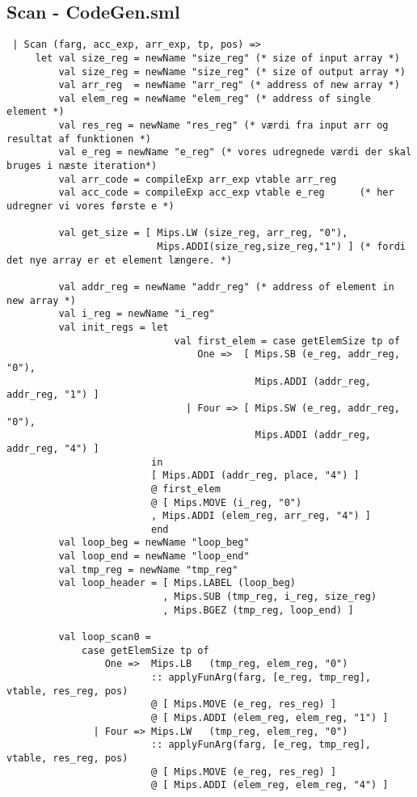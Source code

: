 \documentclass{article}
\begin{document}
\subsection{Scan - CodeGen.sml}\label{app:scan}
\begin{verbatim}
 | Scan (farg, acc_exp, arr_exp, tp, pos) =>
     let val size_reg = newName "size_reg" (* size of input array *)
         val size_reg = newName "size_reg" (* size of output array *)
         val arr_reg  = newName "arr_reg" (* address of new array *)
         val elem_reg = newName "elem_reg" (* address of single element *)
         val res_reg = newName "res_reg" (* værdi fra input arr og resultat af funktionen *)
         val e_reg = newName "e_reg" (* vores udregnede værdi der skal bruges i næste iteration*)
         val arr_code = compileExp arr_exp vtable arr_reg    
         val acc_code = compileExp acc_exp vtable e_reg      (* her udregner vi vores første e *)
         
         val get_size = [ Mips.LW (size_reg, arr_reg, "0"),
                          Mips.ADDI(size_reg,size_reg,"1") ] (* fordi det nye array er et element længere. *)

         val addr_reg = newName "addr_reg" (* address of element in new array *)
         val i_reg = newName "i_reg"
         val init_regs = let
                             val first_elem = case getElemSize tp of
                                 One =>  [ Mips.SB (e_reg, addr_reg, "0"), 
                                           Mips.ADDI (addr_reg, addr_reg, "1") ]
                               | Four => [ Mips.SW (e_reg, addr_reg, "0"),
                                           Mips.ADDI (addr_reg, addr_reg, "4") ]
                         in
                         [ Mips.ADDI (addr_reg, place, "4") ]
                         @ first_elem
                         @ [ Mips.MOVE (i_reg, "0")
                         , Mips.ADDI (elem_reg, arr_reg, "4") ]
                         end
         val loop_beg = newName "loop_beg"
         val loop_end = newName "loop_end"
         val tmp_reg = newName "tmp_reg"
         val loop_header = [ Mips.LABEL (loop_beg)
                           , Mips.SUB (tmp_reg, i_reg, size_reg)
                           , Mips.BGEZ (tmp_reg, loop_end) ]
         
         val loop_scan0 =
             case getElemSize tp of
                 One =>  Mips.LB   (tmp_reg, elem_reg, "0")
                         :: applyFunArg(farg, [e_reg, tmp_reg], vtable, res_reg, pos)
                         @ [ Mips.MOVE (e_reg, res_reg) ]
                         @ [ Mips.ADDI (elem_reg, elem_reg, "1") ]
               | Four => Mips.LW   (tmp_reg, elem_reg, "0")
                         :: applyFunArg(farg, [e_reg, tmp_reg], vtable, res_reg, pos)
                         @ [ Mips.MOVE (e_reg, res_reg) ]
                         @ [ Mips.ADDI (elem_reg, elem_reg, "4") ]
                         

\end{verbatim}
\end{document}
